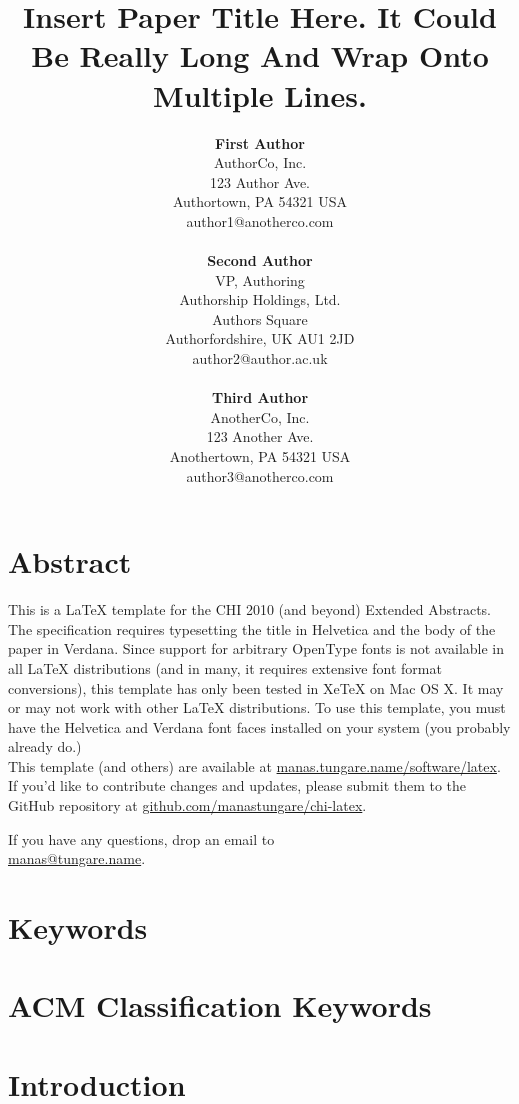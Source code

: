 \documentclass{chi-ext}
\title{Insert Paper Title Here. It Could Be Really Long And Wrap Onto Multiple Lines.}
\author{
  \textbf{First Author} \\
  AuthorCo, Inc. \\
  123 Author Ave. \\
  Authortown, PA 54321 USA \\
  author1@anotherco.com \\
  \\
  \textbf{Second Author} \\
  VP, Authoring \\
  Authorship Holdings, Ltd. \\
  Authors Square \\
  Authorfordshire, UK AU1 2JD \\
  author2@author.ac.uk \\
  \\
  \textbf{Third Author} \\
  AnotherCo, Inc. \\
  123 Another Ave. \\
  Anothertown, PA 54321 USA \\
  author3@anotherco.com \\
}
\begin{document}
\maketitle

\begin{multicols}{2}

\makeauthors
\makecopyright

\section{Abstract}

This is a LaTeX template for the CHI 2010 (and beyond) Extended Abstracts. The specification
requires typesetting the title in Helvetica and the body of the paper in Verdana. Since support for
arbitrary OpenType fonts is not available in all LaTeX distributions (and in many, it requires
extensive font format conversions), this template has only been tested in XeTeX on Mac OS X. It may
or may not work with other LaTeX distributions. To use this template, you must have the Helvetica
and Verdana font faces installed on your system (you probably already do.)
\\

This template (and others) are available at
\href{http://manas.tungare.name/software/latex}{manas.tungare.name/software/latex}.
If you'd like to contribute changes and updates, please submit them to the GitHub repository at
\href{https://github.com/manastungare/chi-latex}{github.com/manastungare/chi-latex}.

If you have any questions, drop an email to \\
\href{mailto:manas@tungare.name}{manas@tungare.name}.

\section{Keywords}
\makeatletter \@keywords \makeatother

\section{ACM Classification Keywords}
\makeatletter \@acmclassification \makeatother


\section{Introduction}


\end{multicols}
\end{document}

